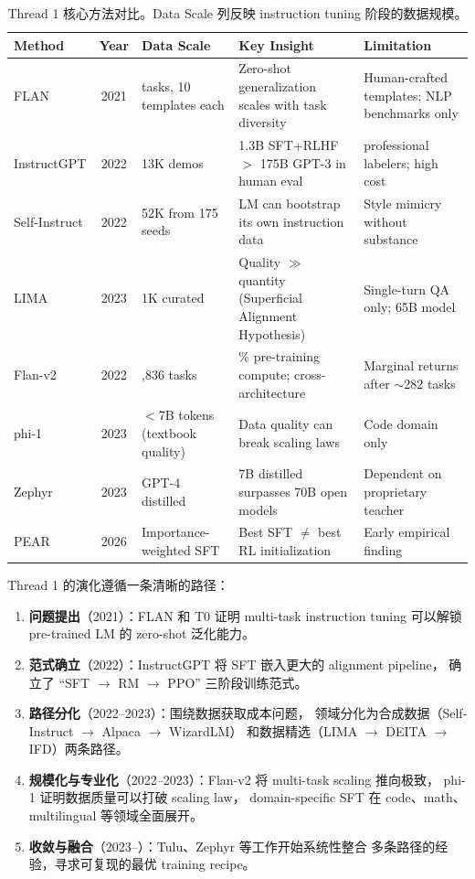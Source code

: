 \begin{table}[!ht]
\centering
\caption{Thread 1 核心方法对比。Data Scale 列反映 instruction tuning 阶段的数据规模。}
\label{tab:sft-comparison}
\small
\begin{tabularx}{\textwidth}{l c >{\raggedright\arraybackslash}p{2.2cm} >{\raggedright\arraybackslash}X >{\raggedright\arraybackslash}X}
\toprule
\textbf{Method} & \textbf{Year} & \textbf{Data Scale} & \textbf{Key Insight} & \textbf{Limitation} \\
\midrule
FLAN & 2021 & 62 tasks, 10 templates each & Zero-shot generalization scales with task diversity & Human-crafted templates; NLP benchmarks only \\
InstructGPT & 2022 & 13K demos & 1.3B SFT+RLHF $>$ 175B GPT-3 in human eval & 40 professional labelers; high cost \\
Self-Instruct & 2022 & 52K from 175 seeds & LM can bootstrap its own instruction data & Style mimicry without substance \\
LIMA & 2023 & 1K curated & Quality $\gg$ quantity (Superficial Alignment Hypothesis) & Single-turn QA only; 65B model \\
Flan-v2 & 2022 & 1,836 tasks & 0.2\% pre-training compute; cross-architecture & Marginal returns after $\sim$282 tasks \\
phi-1 & 2023 & $<$7B tokens (textbook quality) & Data quality can break scaling laws & Code domain only \\
Zephyr & 2023 & GPT-4 distilled & 7B distilled surpasses 70B open models & Dependent on proprietary teacher \\
PEAR & 2026 & Importance-weighted SFT & Best SFT $\neq$ best RL initialization & Early empirical finding \\
\bottomrule
\end{tabularx}
\end{table}

Thread 1 的演化遵循一条清晰的路径：
\begin{enumerate}[leftmargin=1.5em]
  \item \textbf{问题提出}（2021）：FLAN 和 T0 证明 multi-task instruction tuning
    可以解锁 pre-trained LM 的 zero-shot 泛化能力。
  \item \textbf{范式确立}（2022）：InstructGPT 将 SFT 嵌入更大的 alignment pipeline，
    确立了 ``SFT $\rightarrow$ RM $\rightarrow$ PPO'' 三阶段训练范式。
  \item \textbf{路径分化}（2022--2023）：围绕数据获取成本问题，
    领域分化为合成数据（Self-Instruct $\rightarrow$ Alpaca $\rightarrow$ WizardLM）
    和数据精选（LIMA $\rightarrow$ DEITA $\rightarrow$ IFD）两条路径。
  \item \textbf{规模化与专业化}（2022--2023）：Flan-v2 将 multi-task scaling 推向极致，
    phi-1 证明数据质量可以打破 scaling law，
    domain-specific SFT 在 code、math、multilingual 等领域全面展开。
  \item \textbf{收敛与融合}（2023--）：Tulu、Zephyr 等工作开始系统性整合
    多条路径的经验，寻求可复现的最优 training recipe。
\end{enumerate}

